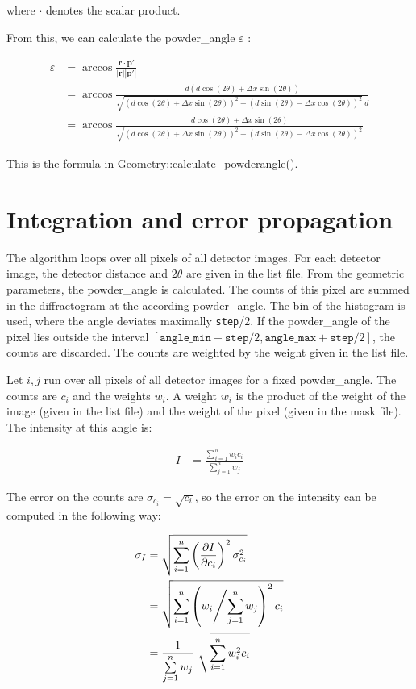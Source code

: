 \documentclass[a4paper, 12pt, twoside]{scrartcl}
\begin{document}
where $ \cdot $ denotes the scalar product.

From this, we can calculate the powder\_angle $ \varepsilon $ :

\begin{align*}
	\varepsilon &= \arccos \frac{\boldsymbol{r} \cdot \boldsymbol{p'}}{|\boldsymbol{r}||\boldsymbol{p'}|} \\
	&= \arccos \frac{d ( d\cos(2\theta) + \Delta x \sin(2\theta))}{\sqrt{(d\cos(2\theta) + \Delta x \sin(2\theta))^2 + (d\sin(2\theta) - \Delta x \cos(2\theta))^2}~d} \\
	&= \arccos \frac{d\cos(2\theta) + \Delta x \sin(2\theta)}{\sqrt{(d\cos(2\theta) + \Delta x \sin(2\theta))^2 + (d\sin(2\theta) - \Delta x \cos(2\theta))^2}}
\end{align*}

This is the formula in Geometry::calculate\_powderangle().

\section{Integration and error propagation}

The algorithm loops over all pixels of all detector images. For each detector image, the detector distance and $ 2\theta $ are given in the list file. From the geometric parameters, the powder\_angle is calculated. The counts of this pixel are summed in the diffractogram at the according powder\_angle. The bin of the histogram is used, where the angle deviates maximally \verb|step|/2. If the powder\_angle of the pixel lies outside the interval $ [\texttt{angle\_min} - \texttt{step}/2, \texttt{angle\_max} + \texttt{step}/2] $, the counts are discarded. The counts are weighted by the weight given in the list file.

Let $ i, j $ run over all pixels of all detector images for a fixed powder\_angle. The counts are $ c_i $ and the weights $ w_i $. A weight $ w_i $ is the product of the weight of the image (given in the list file) and the weight of the pixel (given in the mask file). The intensity at this angle is:

\begin{align*}
	I &= \frac{\sum\limits_{i = 1}^{n} w_i c_i}{\sum\limits_{j=1}^{n} w_j}
\end{align*}

The error on the counts are $ \sigma_{c_i} = \sqrt{c_i} $, so the error on the intensity can be computed in the following way:

\begin{align*}
	\sigma_I &= \sqrt{\sum\limits_{i=1}^{n} \left(\frac{\partial I}{\partial c_i}\right)^2 \sigma_{c_i}^2} \\
	&= \sqrt{\sum\limits_{i=1}^{n} \left(w_i \middle/ \sum\limits_{j=1}^{n} w_j\right)^2 c_i} \\
	&= \frac{1}{\sum\limits_{j=1}^{n} w_j}~ \sqrt{\sum\limits_{i=1}^{n} w_i^2 c_i}
\end{align*}
\end{document}
